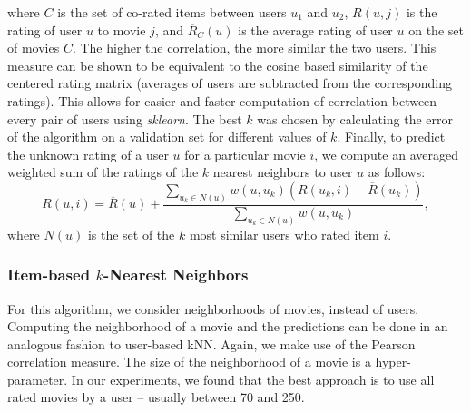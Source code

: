 \documentclass[10pt,conference,compsocconf]{IEEEtran}
\begin{document}
	where $C$ is the set of co-rated items between users $u_1$ and $u_2$, $R(u,j)$ is the rating of user $u$ to movie $j$, and $\overline{R}_C(u)$ is the average rating of user $u$ on the set of movies $C$. The higher the correlation, the more similar the two users. This measure can be shown \cite{L10} to be equivalent to the cosine based similarity of the centered rating matrix (averages of users are subtracted from the corresponding ratings). This allows for easier and faster computation of correlation between every pair of users using \emph{sklearn}. The best $k$ was chosen by calculating the error of the algorithm on a validation set for different values of $k$. Finally, to predict the unknown rating of a user $u$ for a particular movie $i$, we compute an averaged weighted sum of the ratings of the $k$ nearest neighbors to user $u$ as follows:
	\begin{equation} \label{eqn:predict_user_based}
	R(u,i) = \overline{R}(u) + \frac{\sum_{u_k \in N(u)} w(u,u_k)(R(u_k,i) - \overline{R}(u_k))}{\sum_{u_k \in N(u)} w(u,u_k)},
	\end{equation}
	where $N(u)$ is the set of the $k$ most similar users who rated item $i$.
	\\
	
	\subsubsection*{\textbf{Item-based $k$-Nearest Neighbors}}  For this algorithm, we consider neighborhoods of movies, instead of users. Computing the neighborhood of a movie and the predictions can be done in an analogous fashion to user-based kNN. Again, we make use of the Pearson correlation measure. The size of the neighborhood of a movie is a hyper-parameter. In our experiments, we found that the best approach is to use all rated movies by a user -- usually between 70 and 250.
	
	
\end{document}
